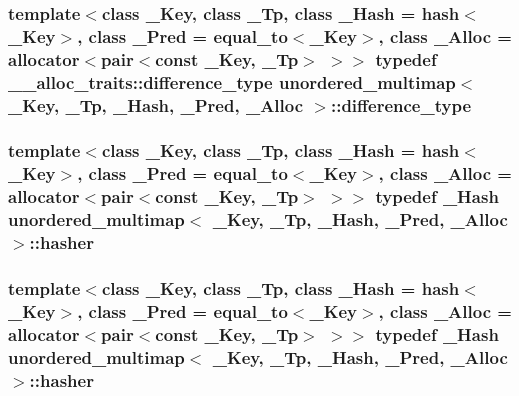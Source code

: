 \subsubsection[{difference\+\_\+type}]{\setlength{\rightskip}{0pt plus 5cm}template$<$class \+\_\+\+Key, class \+\_\+\+Tp, class \+\_\+\+Hash = hash$<$\+\_\+\+Key$>$, class \+\_\+\+Pred = equal\+\_\+to$<$\+\_\+\+Key$>$, class \+\_\+\+Alloc = allocator$<$pair$<$const \+\_\+\+Key, \+\_\+\+Tp$>$ $>$$>$ typedef \+\_\+\+\_\+alloc\+\_\+traits\+::difference\+\_\+type {\bf unordered\+\_\+multimap}$<$ \+\_\+\+Key, \+\_\+\+Tp, \+\_\+\+Hash, \+\_\+\+Pred, \+\_\+\+Alloc $>$\+::{\bf difference\+\_\+type}}\label{classunordered__multimap_ae01816b9f8883bc381dee433486054de}
\hypertarget{classunordered__multimap_a93affc33f5ee930cff353ff62d20daef}{}
\subsubsection[{hasher}]{\setlength{\rightskip}{0pt plus 5cm}template$<$class \+\_\+\+Key, class \+\_\+\+Tp, class \+\_\+\+Hash = hash$<$\+\_\+\+Key$>$, class \+\_\+\+Pred = equal\+\_\+to$<$\+\_\+\+Key$>$, class \+\_\+\+Alloc = allocator$<$pair$<$const \+\_\+\+Key, \+\_\+\+Tp$>$ $>$$>$ typedef \+\_\+\+Hash {\bf unordered\+\_\+multimap}$<$ \+\_\+\+Key, \+\_\+\+Tp, \+\_\+\+Hash, \+\_\+\+Pred, \+\_\+\+Alloc $>$\+::{\bf hasher}}\label{classunordered__multimap_a93affc33f5ee930cff353ff62d20daef}
\hypertarget{classunordered__multimap_a93affc33f5ee930cff353ff62d20daef}{}
\subsubsection[{hasher}]{\setlength{\rightskip}{0pt plus 5cm}template$<$class \+\_\+\+Key, class \+\_\+\+Tp, class \+\_\+\+Hash = hash$<$\+\_\+\+Key$>$, class \+\_\+\+Pred = equal\+\_\+to$<$\+\_\+\+Key$>$, class \+\_\+\+Alloc = allocator$<$pair$<$const \+\_\+\+Key, \+\_\+\+Tp$>$ $>$$>$ typedef \+\_\+\+Hash {\bf unordered\+\_\+multimap}$<$ \+\_\+\+Key, \+\_\+\+Tp, \+\_\+\+Hash, \+\_\+\+Pred, \+\_\+\+Alloc $>$\+::{\bf hasher}}\label{classunordered__multimap_a93affc33f5ee930cff353ff62d20daef}
\hypertarget{classunordered__multimap_a7b508cae41ac3a258ca80609ec43db47}{}
